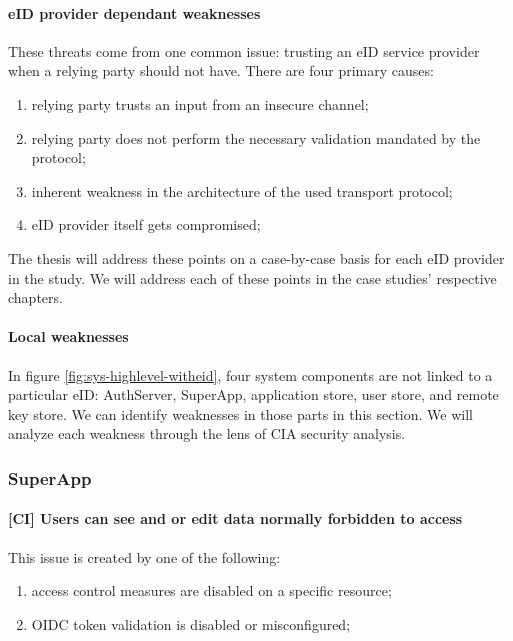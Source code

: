 \paragraph{eID provider dependant weaknesses}

These threats come from one common issue: trusting an eID service provider when a relying party should not have. There are four primary causes:

\begin{enumerate}
  \item relying party trusts an input from an insecure channel;
  \item relying party does not perform the necessary validation mandated by the protocol;
  \item inherent weakness in the architecture of the used transport protocol;
  \item eID provider itself gets compromised;
\end{enumerate}

The thesis will address these points on a case-by-case basis for each eID provider in the study. We will address each of these points in the case studies' respective chapters.

\paragraph{Local weaknesses}

In figure \ref{fig:sys-highlevel-witheid}, four system components are not linked to a particular eID: AuthServer, SuperApp, application store, user store, and remote key store. We can identify weaknesses in those parts in this section. We will analyze each weakness through the lens of CIA security analysis.

\subsubsection{SuperApp}

\paragraph{[CI] Users can see and or edit data normally forbidden to access} This issue is created by one of the following:

\begin{enumerate}
  \item access control measures are disabled on a specific resource;
  \item OIDC token validation is disabled or misconfigured;
\end{enumerate}

